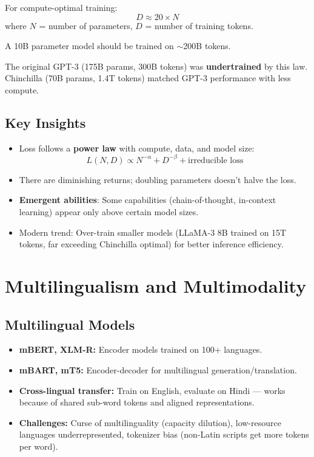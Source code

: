 \documentclass[11pt,a4paper]{article}
\begin{document}
\begin{keybox}
For compute-optimal training:
\[
  D \approx 20 \times N
\]
where $N$ = number of parameters, $D$ = number of training tokens.

A 10B parameter model should be trained on $\sim$200B tokens.

The original GPT-3 (175B params, 300B tokens) was \textbf{undertrained} by this law. Chinchilla (70B params, 1.4T tokens) matched GPT-3 performance with less compute.
\end{keybox}

\subsection{Key Insights}
\begin{itemize}[nosep]
  \item Loss follows a \textbf{power law} with compute, data, and model size:
  \[
    L(N, D) \propto N^{-\alpha} + D^{-\beta} + \text{irreducible loss}
  \]
  \item There are diminishing returns; doubling parameters doesn't halve the loss.
  \item \textbf{Emergent abilities}: Some capabilities (chain-of-thought, in-context learning) appear only above certain model sizes.
  \item Modern trend: Over-train smaller models (LLaMA-3 8B trained on 15T tokens, far exceeding Chinchilla optimal) for better inference efficiency.
\end{itemize}

\section{Multilingualism and Multimodality}

\subsection{Multilingual Models}
\begin{itemize}[nosep]
  \item \textbf{mBERT, XLM-R:} Encoder models trained on 100+ languages.
  \item \textbf{mBART, mT5:} Encoder-decoder for multilingual generation/translation.
  \item \textbf{Cross-lingual transfer:} Train on English, evaluate on Hindi --- works because of shared sub-word tokens and aligned representations.
  \item \textbf{Challenges:} Curse of multilinguality (capacity dilution), low-resource languages underrepresented, tokenizer bias (non-Latin scripts get more tokens per word).
\end{itemize}
\end{document}
